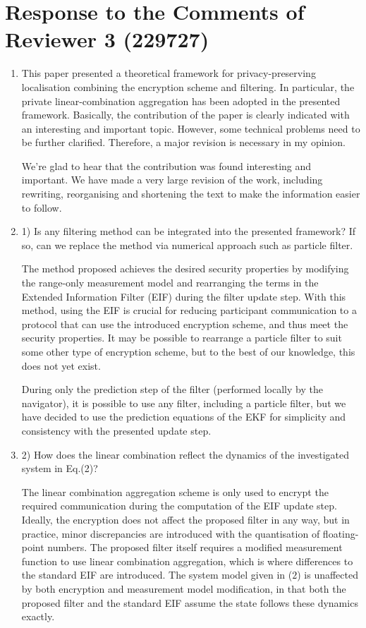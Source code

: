 \documentclass[a4paper]{scrartcl}
\newenvironment{rebuttal}{\begin{enumerate}[label={\color{grey}\thesection.\arabic{enumi}},leftmargin=0pt,ref=\thesection.\arabic{enumi}]}{\end{enumerate}}
\newcommand{\reviewtext}[1]{{\color{nblue} #1}}
\begin{document}
\section*{Response to the Comments of Reviewer 3 (229727)}
\def\thesection{R3}
\begin{rebuttal}
\item \reviewtext{This paper presented a theoretical framework for privacy-preserving localisation combining the encryption scheme and filtering. In particular, the private linear-combination aggregation has been adopted in the presented framework. Basically, the contribution of the paper is clearly indicated with an interesting and important topic. However, some technical problems need to be further clarified. Therefore, a major revision is necessary in my opinion.}

We're glad to hear that the contribution was found interesting and important. We have made a very large revision of the work, including rewriting, reorganising and shortening the text to make the information easier to follow.

\item \reviewtext{1) Is any filtering method can be integrated into the presented framework? If so, can we replace the method via numerical approach such as particle filter.}

The method proposed achieves the desired security properties by modifying the range-only measurement model and rearranging the terms in the Extended Information Filter (EIF) during the filter update step. With this method, using the EIF is crucial for reducing participant communication to a protocol that can use the introduced encryption scheme, and thus meet the security properties. It may be possible to rearrange a particle filter to suit some other type of encryption scheme, but to the best of our knowledge, this does not yet exist.

During only the prediction step of the filter (performed locally by the navigator), it is possible to use any filter, including a particle filter, but we have decided to use the prediction equations of the EKF for simplicity and consistency with the presented update step.

\item \reviewtext{2) How does the linear combination reflect the dynamics of the investigated system in Eq.(2)?}
  
The linear combination aggregation scheme is only used to encrypt the required communication during the computation of the EIF update step. Ideally, the encryption does not affect the proposed filter in any way, but in practice, minor discrepancies are introduced with the quantisation of floating-point numbers. The proposed filter itself requires a modified measurement function to use linear combination aggregation, which is where differences to the standard EIF are introduced. The system model given in ($2$) is unaffected by both encryption and measurement model modification, in that both the proposed filter and the standard EIF assume the state follows these dynamics exactly.


\end{rebuttal}
\end{document}
